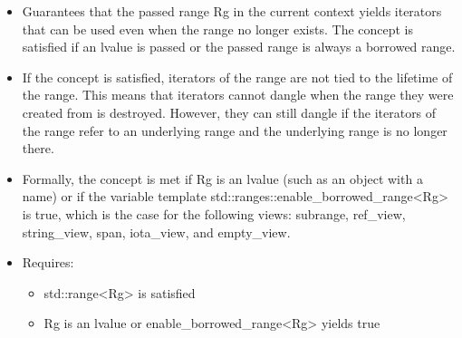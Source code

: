 \begin{itemize}
\item
Guarantees that the passed range Rg in the current context yields iterators that can be used even when the range no longer exists. The concept is satisfied if an lvalue is passed or the passed range is always a borrowed range.

\item
If the concept is satisfied, iterators of the range are not tied to the lifetime of the range. This means that iterators cannot dangle when the range they were created from is destroyed. However, they can still dangle if the iterators of the range refer to an underlying range and the underlying range is no longer there.

\item
Formally, the concept is met if Rg is an lvalue (such as an object with a name) or if the variable template std::ranges::enable\_borrowed\_range<Rg> is true, which is the case for the following views: subrange, ref\_view, string\_view, span, iota\_view, and empty\_view.

\item
Requires:

\begin{itemize}
\item
std::range<Rg> is satisfied

\item
Rg is an lvalue or enable\_borrowed\_range<Rg> yields true
\end{itemize}
\end{itemize}


